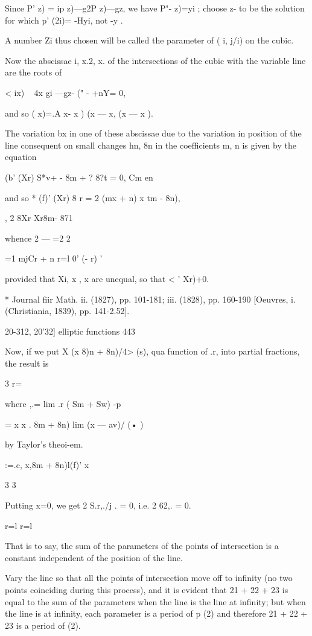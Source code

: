{Since P'   z) = ip  z)—g2P z)—gz, we have P"- z)=yi  ; choose z-  to be the solution for 
which p' (2i)= -Hyi, not -y . 

A number Zi thus chosen will be called the parameter of ( i, j/i) on the cubic. 

Now the abscissae  i, x.2, x.  of the intersections of the cubic with the variable line 
are the roots of 

<  ix) ~ 4x gi —gz- (" -  +nY= 0, 

and so (  x)=.A x- x ) (x — x,  (x — x ). 

The variation bx  in one of these abscissae due to the variation in position of the line 
consequent on small changes hn, 8n in the coefficients m, n is given by the equation 

(b' (Xr) S*v+  - 8m + ?  8?t = 0, 
  Cm en 

and so * (f)' (Xr) 8 r = 2 (mx  + n)  x tm -  8n), 

, 2 8Xr     Xr8m-  871 

whence 2  — =2 2 



=1 mjCr + n r=l 0' (- r) ' 

provided that Xi, x , x  are unequal, so that < '  Xr)+0. 

* Journal fiir Math. ii. (1827), pp. 101-181; iii. (1828), pp. 160-190 [Oeuvres, i. (Christiania, 
1839), pp. 141-2.52]. 



20-312, 20'32] elliptic functions 443 

Now, if we put X (x 8)n + 8n)/4> (s), qua function of .r, into partial fractions, the result is 

3 
r=\ 

where  ,.= lim .r ( Sm + Sw) -p  

= x   x . 8m + 8n) lim (x — av)/  (•  ) 



by Taylor's theoi-em. 



:=.c, x,8m + 8n)l(f)'  x \ 



3 3 

Putting x=0, we get 2 S.r,./j . = 0, i.e. 2 62,. = 0. 

r=l r=l 

That is to say, the sum of the parameters of the points of intersection is a constant 
independent of the position of the line. 

Vary the line so that all the points of intersection move off to infinity (no two points 
coinciding during this process), and it is evident that 21 + 22 + 23 is equal to the sum of the 
parameters when the line is the line at infinity; but when the line is at infinity, each 
parameter is a period of p (2) and therefore 21 + 22 + 23 is a period of   (2). 

}
